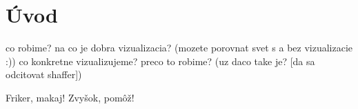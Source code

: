 \section{Úvod}

co robime? na co je dobra vizualizacia? (mozete porovnat svet s a bez vizualizacie :))
co konkretne vizualizujeme? preco to robime? (uz daco take je? [da sa odcitovat shaffer])

Friker, makaj! Zvyšok, pomôž!